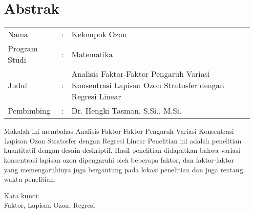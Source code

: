 %
%
%

\chapter*{Abstrak}

\vspace*{0.2cm}
{
	\setlength{\parindent}{0pt}
	
	\begin{tabular}{@{}l l p{10cm}}
		Nama&: & Kelompok Ozon \\
		Program Studi&: & Matematika \\
		Judul&: & Analisis Faktor-Faktor Pengaruh Variasi  Konsentrasi Lapisan Ozon Stratosfer dengan Regresi Linear \\
		Pembimbing&: & Dr. Hengki Tasman, S.Si., M.Si. \\
	\end{tabular}

	\bigskip
	\bigskip
    Makalah ini membahas Analisis Faktor-Faktor Pengaruh Variasi  Konsentrasi Lapisan Ozon Stratosfer dengan Regresi Linear Penelitian ini adalah penelitian kuantitatif dengan desain deskriptif. Hasil penelitian didapatkan bahwa variasi konsentrasi lapisan ozon dipengaruhi oleh beberapa faktor, dan faktor-faktor yang memengaruhinya juga bergantung pada lokasi penelitian dan juga rentang waktu penelitian. 

	\bigskip

	Kata kunci:\\
	Faktor, Lapisan Ozon, Regresi
}

\newpage